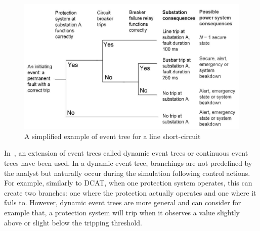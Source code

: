 \begin{figure}
    \centering
    \includegraphics[width=0.8\linewidth]{Figs/EventTree.png}
    \caption{A simplified example of event tree for a line short-circuit~\cite{GridPSA}}
    \label{fig:eventTree}
\end{figure}

In~\cite{TwoLevelPSA, Faghihi}, an extension of event trees called dynamic event trees or continuous event trees have been used. In a dynamic event tree, branchings are not predefined by the analyst but naturally occur during the simulation following control actions. For example, similarly to DCAT, when one protection system operates, this can create two branches: one where the protection actually operates and one where it fails to. However, dynamic event trees are more general and can consider for example that, a protection system will trip when it observes a value slightly above or slight below the tripping threshold.


